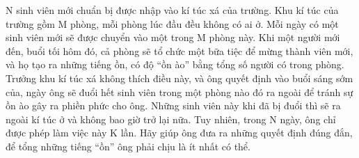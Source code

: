 N sinh viên mới chuẩn bị được nhập vào kí túc xá của trường. Khu kí túc của trường gồm M phòng, mỗi phòng lúc đầu đều không có ai ở. Mỗi ngày có một sinh viên mới sẽ được chuyển vào một trong M phòng này. Khi một người mới đến, buổi tối hôm đó, cả phòng sẽ tổ chức một bữa tiệc để mừng thành viên mới, và họ tạo ra những tiếng ồn, có độ “ồn ào” bằng tổng số người có trong phòng. Trưởng khu kí túc xá không thích điều này, và ông quyết định vào buổi sáng sớm của, ngày ông sẽ đuổi hết sinh viên trong một phòng nào đó ra ngoài để tránh sự ồn ào gây ra phiền phức cho ông. Những sinh viên này khi đã bị đuổi thì sẽ ra ngoài kí túc ở và không bao giờ trở lại nữa. Tuy nhiên, trong N ngày, ông chỉ được phép làm việc này K lần. Hãy giúp ông đưa ra những quyết định đúng đắn, để tổng những tiếng “ồn” ông phải chịu là ít nhất có thể.  

\